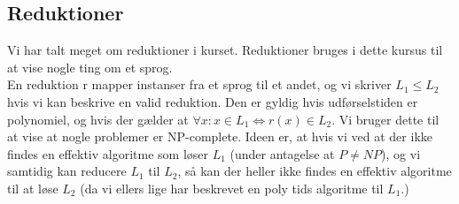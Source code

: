 \documentclass{article}
\begin{document}
\subsection{Reduktioner}
Vi har talt meget om reduktioner i kurset. Reduktioner bruges i dette kursus til at vise nogle ting om et sprog.\\
En reduktion r mapper instanser fra et sprog til et andet, og vi skriver $L_1 \le L_2$ hvis vi kan beskrive en valid reduktion. Den er gyldig hvis udførselstiden er polynomiel, og hvis der gælder at $\forall x: x\in L_1 \iff r(x)\in L_2$. Vi bruger dette til at vise at nogle problemer er NP-complete. Ideen er, at hvis vi ved at der ikke findes en effektiv algoritme som løser $L_1$ (under antagelse at $P\ne NP$), og vi samtidig kan reducere $L_1$ til $L_2$, så kan der heller ikke findes en effektiv algoritme til at løse $L_2$ (da vi ellers lige har beskrevet en poly tids algoritme til $L_1$.)
\end{document}

